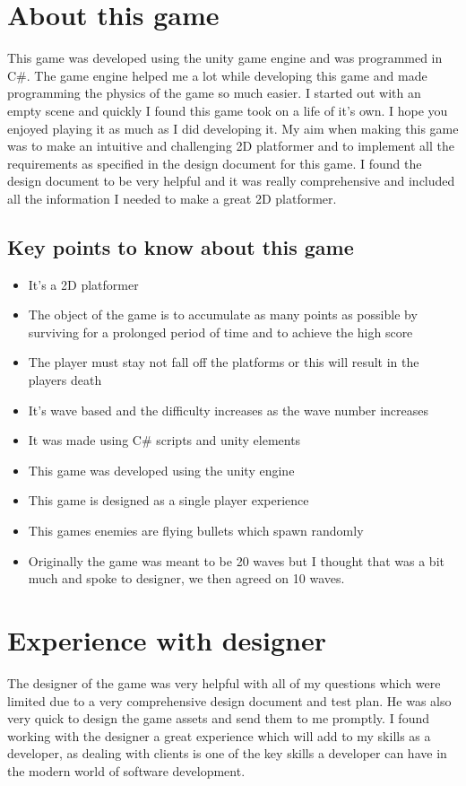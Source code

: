 \documentclass{report}
\begin{document}
\section{About this game}
 This game was developed using the unity game engine and was programmed in C\#.  The game engine helped me a lot while developing this game and made programming the physics of the game so much easier.  I started out with an empty scene and quickly I found this game took on a life of it's own.  I hope you enjoyed playing it as much as I did developing it.  My aim when making this game was to make an intuitive and challenging 2D platformer and to implement all the requirements as specified in the design document for this game.  I found the design document to be very helpful and it was really comprehensive and included all the information I needed to make a great 2D platformer.
 \subsection{Key points to know about this game}
 \begin{itemize}
     \item It's a 2D platformer
     \item The object of the game is to accumulate as many points as possible by surviving for a prolonged period of time and to achieve the high score
     \item The player must stay not fall off the platforms or this will result in the players death
     \item It's wave based and the difficulty increases as the wave number increases
     \item It was made using C\# scripts and unity elements
     \item This game was developed using the unity engine
     \item This game is designed as a single player experience
     \item This games enemies are flying bullets which spawn randomly
     \item Originally the game was meant to be 20 waves but I thought that was a bit much and spoke to designer, we then agreed on 10 waves.
 \end{itemize}
 \section{Experience with designer}
 The designer of the game was very helpful with all of my questions which were limited due to a very comprehensive design document and test plan.  He was also very quick to design the game assets and send them to me promptly.  I found working with the designer a great experience which will add to my skills as a developer, as dealing with clients is one of the key skills a developer can have in the modern world of software development.
\end{document}
